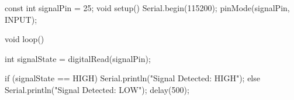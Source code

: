const int signalPin = 25;
void setup() {
  Serial.begin(115200);
  pinMode(signalPin, INPUT);
}

void loop() {
  int signalState = digitalRead(signalPin);

  if (signalState == HIGH) {
    Serial.println("Signal Detected: HIGH");
} else {
  Serial.println("Signal Detected: LOW");
}
 delay(500);
}

